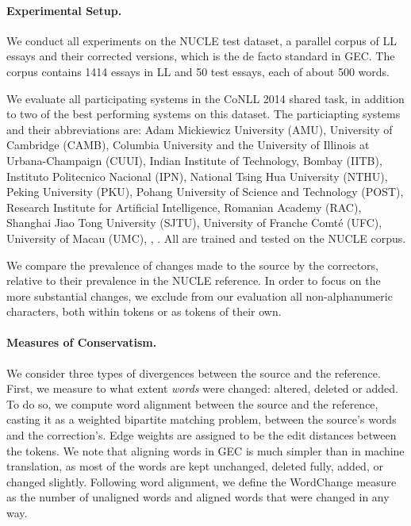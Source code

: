 \documentclass[letterpaper, 11pt]{article}
\newcommand{\oa}[1]{\footnote{\color{red}OA: #1}}
\begin{document}
\paragraph{Experimental Setup.}\label{par:experimental_setup}
We conduct all experiments on the NUCLE test dataset,
a parallel corpus of LL essays and their corrected versions,
which is the de facto standard in GEC.
The corpus contains 1414 essays in LL and 50 test essays, each of about 500 words.

We evaluate all participating systems in the CoNLL 2014 shared task,
in addition to two of the best performing systems on this dataset.
The particiapting systems and their abbreviations are: Adam Mickiewicz University (AMU),
University of Cambridge (CAMB), Columbia University and the University of Illinois at Urbana-Champaign (CUUI),
Indian Institute of Technology, Bombay (IITB), Instituto Politecnico Nacional (IPN),
National Tsing Hua University (NTHU), Peking University (PKU), Pohang University of Science and Technology (POST),
Research Institute for Artificial Intelligence, Romanian Academy (RAC), Shanghai Jiao Tong University (SJTU),
University of Franche Comt\'{e} (UFC), University of Macau (UMC), , .
All are trained and tested on the NUCLE corpus.

We compare the prevalence of changes made to the source by the correctors,
relative to their prevalence in the NUCLE reference.
In order to focus on the more substantial changes, we exclude from our evaluation
all non-alphanumeric characters, both within tokens or as tokens of their own.
%

\paragraph{Measures of Conservatism.}
We consider three types of divergences between the source and the reference.
First, we measure to what extent \emph{words} were changed: altered, deleted or added.
To do so, we compute word alignment between the source and the reference, casting it
as a weighted bipartite matching problem, between the source's words and the correction's. 
Edge weights are assigned to be the edit distances
between the tokens.
We note that aligning words in GEC is much simpler than in machine translation,
as most of the words are kept unchanged, deleted fully, added, or changed slightly.
Following word alignment, we define the {\sc WordChange} measure
as the number of unaligned words and aligned words that were changed in any way.
\end{document}

